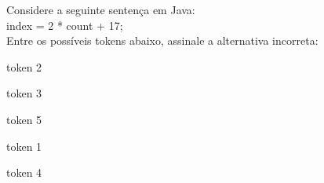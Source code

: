 \question[10]

Considere a seguinte sentença em Java:\\
index = 2 * count + 17;\\
Entre os possíveis tokens abaixo, assinale a alternativa incorreta:\\
\begin{choices}
\item token 2
\item token 3 
\item token 5 %
\item token 1 
\item token 4
\end{choices}
\answerline

